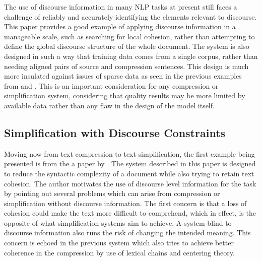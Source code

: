 {The use of discourse information in many NLP tasks at present still faces a challenge of reliably and accurately identifying the elements relevant to discourse.  This paper provides a good example of applying discourse information in a manageable scale, such as searching for local cohesion, rather than attempting to define the global discourse structure of the whole document.  The system is also designed in such a way that training data comes from a single corpus, rather than needing aligned pairs of source and compression sentences.  This design is much more insulated against issues of sparse data as seen in the previous examples from \citet{galley2007lexicalized} and \citet{knight2000statistics}.  This is an important consideration for any compression or simplification system, considering that quality results may be more limited by available data rather than any flaw in the design of the model itself.}


\subsection{Simplification with Discourse Constraints}



{Moving now from text compression to text simplification, the first example being presented is from the a paper by \citet{Siddharthan2006}.  The system described in this paper is designed to reduce the syntactic complexity of a document while also trying to retain text cohesion.  The author motivates the use of discourse level information for the task by pointing out several problems which can arise from compression or simplification without discourse information.  The first concern is that a loss of cohesion could make the text more difficult to comprehend, which in effect, is the opposite of what simplification systems aim to achieve. A system blind to discourse information also runs the risk of changing the intended meaning.  This concern is echoed in the previous system which also tries to achieve better coherence in the compression by use of lexical chains and centering theory.}

